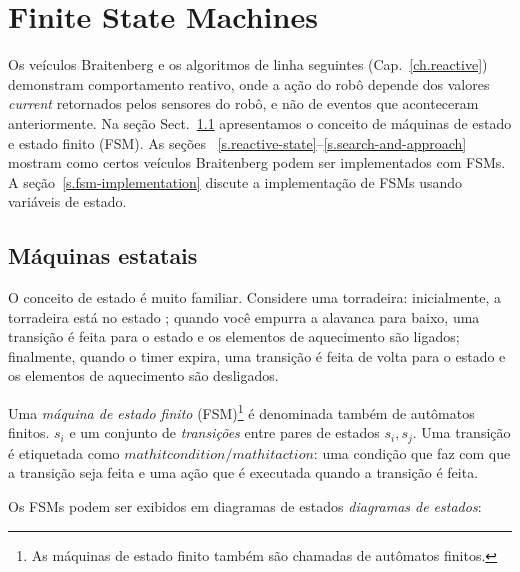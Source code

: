 
\chapter{Finite State Machines}\label{ch.fmg}

Os veículos Braitenberg e os algoritmos de linha seguintes (Cap.~\ref{ch.reactive}) demonstram comportamento reativo, onde a ação do robô depende dos valores \emph{current} retornados pelos sensores do robô, e não de eventos que aconteceram anteriormente. Na seção Sect.~\ref{s.sm} apresentamos o conceito de máquinas de estado e estado finito (FSM). As seções ~\ref{s.reactive-state}--\ref{s.search-and-approach} mostram como certos veículos Braitenberg podem ser implementados com FSMs. A seção~\ref{s.fsm-implementation} discute a implementação de FSMs usando variáveis de estado.

\section{Máquinas estatais}\label{s.sm}

O conceito de estado é muito familiar. Considere uma torradeira: inicialmente, a torradeira está no estado ; quando você empurra a alavanca para baixo, uma transição é feita para o estado  e os elementos de aquecimento são ligados; finalmente, quando o timer expira, uma transição é feita de volta para o estado  e os elementos de aquecimento são desligados.

Uma \emph{máquina de estado finito} (FSM)\footnote{As máquinas de estado finito também são chamadas de autômatos finitos.} é denominada também de autômatos finitos. $s_i$ e um conjunto de \emph{transições} entre pares de estados $s_i, s_j$. Uma transição é etiquetada como $mathit{condition}/mathit{action}$: uma condição que faz com que a transição seja feita e uma ação que é executada quando a transição é feita.

Os FSMs podem ser exibidos em diagramas de estados \emph{diagramas de estados}:
\begin{center}
\end{center}

